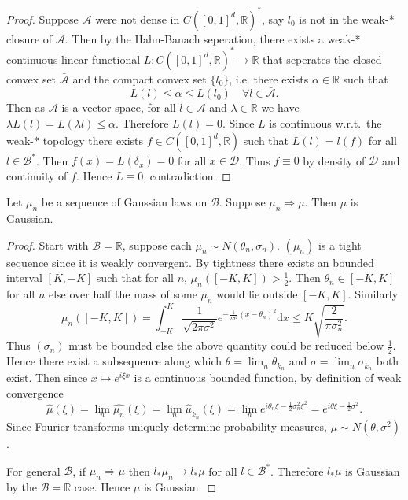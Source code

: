 \documentclass[fontsize=12pt, DIV=10]{scrreprt}
\theoremstyle{remark}
\newcommand{\R}{\mathbb R}
\newcommand{\calA}{\mathcal A}
\newcommand{\calB}{\mathcal B}
\newcommand{\calD}{\mathcal D}
\newcommand{\dif}[1]{\text{d} #1}
\newcommand{\towk}{\Rightarrow}
\newcommand{\unitbox}{\ensuremath{[0,1]^d}}
\begin{document}
\dirac*

\begin{proof}
	Suppose $\calA$ were not dense in $C(\unitbox, \R)^*$, say $l_0$ is not in the weak-* closure of $\calA$. Then by the Hahn-Banach seperation, there exists a weak-* continuous linear functional $L: C(\unitbox, \R)^* \to \R$ that seperates the closed convex set $\bar{\calA}$ and the compact convex set $\{l_0\}$, i.e. there exists $\alpha \in \R$ such that
	\begin{equation}
		L(l) \leq \alpha \leq L(l_0) \quad \forall l \in \bar{\calA}.
	\end{equation}
	Then as $\calA$ is a vector space, for all $l \in \calA$ and $\lambda \in \R$ we have $\lambda L(l) = L(\lambda l) \leq \alpha$. Therefore $L(l) = 0$. Since $L$ is continuous w.r.t.\ the weak-$*$ topology there exists $f \in C(\unitbox, \R)$ such that $L(l) = l(f)$ for all $l \in \calB^*$. Then $f(x) = L(\delta_x) = 0$ for all $x \in \calD$. Thus $f \equiv 0$ by density of $\calD$ and continuity of $f$. Hence $L \equiv 0$, contradiction.
\end{proof}

\begin{prop}
	\label{prop:weak-convergence-gaussians}
	Let $\mu_n$ be a sequence of Gaussian laws on $\calB$. Suppose $\mu_n \towk \mu$. Then $\mu$ is Gaussian.
\end{prop}
\begin{proof}
	Start with $\calB = \R$, suppose each $\mu_n \sim N(\theta_n, \sigma_n)$. $(\mu_n)$ is a tight sequence since it is weakly convergent. By tightness there exists an bounded interval $[K, -K]$ such that for all $n$, $\mu_n([-K, K]) > \frac{1}{2}$. Then $\theta_n \in [-K, K]$ for all $n$ else over half the mass of some $\mu_n$ would lie outside $[-K, K]$. Similarly
	\begin{equation}
		\mu_n([-K, K]) = \int_{-K}^K \frac{1}{\sqrt{2 \pi \sigma^2}} e^{-\frac{1}{2\sigma^2}(x - \theta_n)^2} \dif x \leq K \sqrt{\frac{2}{\pi\sigma_n^2}}.
		\end{equation}
		Thus $(\sigma_n)$ must be bounded else the above quantity could be reduced below $\frac{1}{2}$. Hence there exist a subsequence along which $\theta = \lim_n \theta_{k_n}$ and $\sigma = \lim_n \sigma_{k_n}$ both exist. Then since $x \mapsto e^{i \xi x}$ is a continuous bounded function, by definition of weak convergence
	\begin{equation}
		\hat{\mu}(\xi) = \lim_n \hat{\mu_n}(\xi) = \lim_n \hat{\mu}_{k_n}(\xi) = \lim_n e^{i \theta_n \xi - \frac{1}{2} \sigma_n^2 \xi^2} = e^{i \theta \xi - \frac{1}{2} \sigma^2}.
	\end{equation}
	Since Fourier transforms uniquely determine probability measures, $\mu \sim N(\theta, \sigma^2)$.

	For general $\calB$, if $\mu_n \towk \mu$ then $l_* \mu_n \to l_* \mu$ for all $l \in \calB^*$. Therefore $l_* \mu$ is Gaussian by the $\calB = \R$ case. Hence $\mu$ is Gaussian.
\end{proof}

\printbibliography
\end{document}
